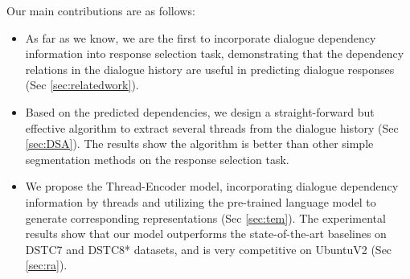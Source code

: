  
Our main contributions are as follows:
\begin{itemize}
	\item As far as we know, we are the first to incorporate dialogue 
dependency information into response selection task, 
demonstrating that the dependency relations in the dialogue history 
are useful in predicting dialogue responses (Sec \ref{sec:relatedwork}). 
	\item Based on the predicted dependencies, we design a straight-forward but effective algorithm to extract several threads from the dialogue history  (Sec \ref{sec:DSA}). 
The results show the algorithm is better than other simple segmentation 
methods on the response selection task.
	\item We propose the Thread-Encoder model, incorporating dialogue 
dependency information by threads and utilizing the pre-trained language 
model to generate corresponding representations (Sec \ref{sec:tem}). The experimental results 
show that our model outperforms the state-of-the-art baselines on 
DSTC7 and DSTC8* datasets, and is very competitive on UbuntuV2 (Sec \ref{sec:ra}).
\end{itemize}





